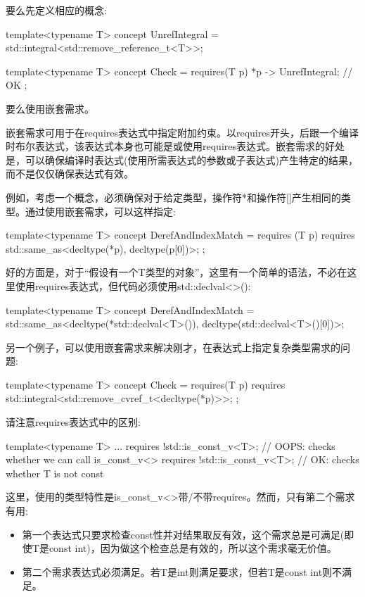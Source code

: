 要么先定义相应的概念:

\begin{cpp}
template<typename T>
concept UnrefIntegral = std::integral<std::remove_reference_t<T>>;

template<typename T>
concept Check = requires(T p) {
	{ *p } -> UnrefIntegral; // OK
};
\end{cpp}

要么使用嵌套需求。


嵌套需求可用于在requires表达式中指定附加约束。以requires开头，后跟一个编译时布尔表达式，该表达式本身也可能是或使用requires表达式。嵌套需求的好处是，可以确保编译时表达式(使用所需表达式的参数或子表达式)产生特定的结果，而不是仅仅确保表达式有效。

例如，考虑一个概念，必须确保对于给定类型，操作符*和操作符[]产生相同的类型。通过使用嵌套需求，可以这样指定:

\begin{cpp}
template<typename T>
concept DerefAndIndexMatch = requires (T p) {
								requires std::same_as<decltype(*p),
										decltype(p[0])>;
							};
\end{cpp}

好的方面是，对于“假设有一个T类型的对象”，这里有一个简单的语法，不必在这里使用requires表达式，但代码必须使用std::declval<>():

\begin{cpp}
template<typename T>
concept DerefAndIndexMatch = std::same_as<decltype(*std::declval<T>()),
			 decltype(std::declval<T>()[0])>;
\end{cpp}

另一个例子，可以使用嵌套需求来解决刚才，在表达式上指定复杂类型需求的问题:

\begin{cpp}
template<typename T>
concept Check = requires(T p) {
	requires std::integral<std::remove_cvref_t<decltype(*p)>>;
};
\end{cpp}

请注意requires表达式中的区别:

\begin{cpp}
template<typename T>
... requires {
	!std::is_const_v<T>; // OOPS: checks whether we can call is_const_v<>
	requires !std::is_const_v<T>; // OK: checks whether T is not const
}
\end{cpp}

这里，使用的类型特性是is\_const\_v<>带/不带requires。然而，只有第二个需求有用:

\begin{itemize}
\item
第一个表达式只要求检查const性并对结果取反有效，这个需求总是可满足(即使T是const int)，因为做这个检查总是有效的，所以这个需求毫无价值。

\item
第二个需求表达式必须满足。若T是int则满足要求，但若T是const int则不满足。
\end{itemize}

